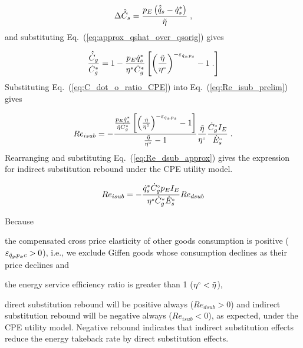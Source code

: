 \begin{equation}
  \Delta \hat{\dot{C}}_s = \frac{p_E \left( \hat{\dot{q}}_s - {\dot{q}}^*_s \right)}{\tilde{\eta}} \; ,
\end{equation}
%
and 
substituting Eq.~(\ref{eq:approx_qshat_over_qsorig}) gives

\begin{equation} \label{eq:C_dot_o_ratio_CPE}
  \frac{\hat{\dot{C}}_g}{{\dot{C}}^*_g} = 1 - \frac{p_E {\dot{q}}^*_s}{{\eta}^*  {\dot{C}}^*_g} \left[ \left( \frac{\tilde{\eta}}{{}{\eta}^{\scriptscriptstyle \circ}} \right)^{-\varepsilon_{\dot{q}_s\!,p_s}} - 1 \; . \right]
\end{equation}
%
Substituting Eq.~(\ref{eq:C_dot_o_ratio_CPE}) 
into Eq.~(\ref{eq:Re_isub_prelim}) gives

\begin{equation}
  Re_{isub} = - \frac{\frac{p_E {\dot{q}}^*_s}{\tilde{\eta} {\dot{C}}^*_g}
                   \left[ \left( \frac{\tilde{\eta}}{{}{\eta}^{\scriptscriptstyle \circ}} \right)^{-\varepsilon_{\dot{q}_s\!,p_s}} - 1   \right] }
                {\frac{\tilde{\eta}}{{}{\eta}^{\scriptscriptstyle \circ}} - 1} 
                \frac{\tilde{\eta}}{{}{\eta}^{\scriptscriptstyle \circ}} 
                \frac{{}{\dot{C}}^{\scriptscriptstyle \circ}_g I_E}{{}{\dot{E}}^{\scriptscriptstyle \circ}_s} \; .
\end{equation}
%
Rearranging and substituting Eq.~(\ref{eq:Re_dsub_approx}) gives
the expression for indirect substitution rebound under the
CPE utility model.

\begin{equation} \label{eq:Re_isub_cpe}
  Re_{isub} = - \frac{{\dot{q}}^*_s {}{\dot{C}}^{\scriptscriptstyle \circ}_g p_E I_E}{{}{\eta}^{\scriptscriptstyle \circ} {\dot{C}}^*_g {}{\dot{E}}^{\scriptscriptstyle \circ}_s} Re_{dsub}
\end{equation}

Because %
\begin{enumerate*}[label={(\roman*)}]
	
  \item the compensated cross price elasticity 
        of other goods consumption is positive ($\varepsilon_{\dot{q}_g\!,p_s\!,c} > 0$), 
        i.e., we exclude Giffen goods 
        \citep{Spiegel:1994aa}
        whose consumption declines 
        as their price declines and
  
  \item the energy service efficiency ratio is greater than 1
        (${}{\eta}^{\scriptscriptstyle \circ} < \tilde{\eta}$),
    
\end{enumerate*}
%
direct substitution rebound will be positive always
($Re_{dsub} > 0$) and
indirect substitution rebound will be negative always
($Re_{isub} < 0$),
as expected, under the CPE utility model.
Negative rebound indicates that indirect substitution effects 
reduce the energy takeback rate by direct substitution effects.


